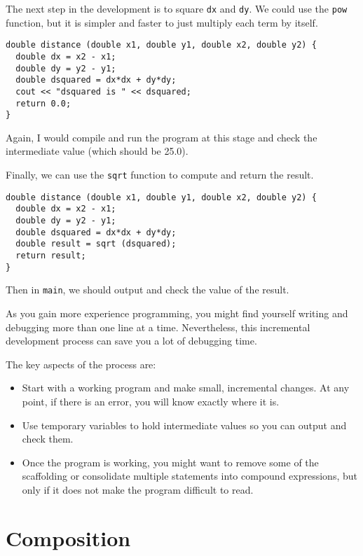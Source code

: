 The next step in the development is to square {\tt dx} and {\tt dy}.
We could use the {\tt pow} function, but it is simpler and
faster to just multiply each term by itself.

\begin{verbatim}
double distance (double x1, double y1, double x2, double y2) {
  double dx = x2 - x1;
  double dy = y2 - y1;
  double dsquared = dx*dx + dy*dy;
  cout << "dsquared is " << dsquared;
  return 0.0;
}
\end{verbatim}
%
Again, I would compile and run the program at this stage
and check the intermediate value (which should be 25.0).

Finally, we can use the {\tt sqrt} function to compute and
return the result.

\begin{verbatim}
double distance (double x1, double y1, double x2, double y2) {
  double dx = x2 - x1;
  double dy = y2 - y1;
  double dsquared = dx*dx + dy*dy;
  double result = sqrt (dsquared);
  return result;
}
\end{verbatim}
%
Then in {\tt main}, we should output and check the value of the result.

As you gain more experience programming, you might find yourself
writing and debugging more than one line at a time.  Nevertheless,
this incremental development process can save you a lot of
debugging time.

The key aspects of the process are:

\begin{itemize}

\item Start with a working program and make small, incremental
changes.  At any point, if there is an error, you will know
exactly where it is.

\item Use temporary variables to hold intermediate values so
you can output and check them.

\item Once the program is working, you might want to remove
some of the scaffolding or consolidate multiple statements into
compound expressions, but only if it does not make the program
difficult to read.

\end{itemize}

\section{Composition}

